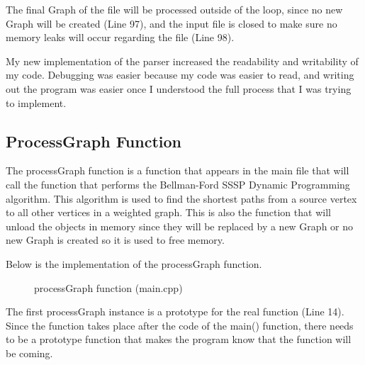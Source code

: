 \documentclass[letterpaper, 10pt]{article}
\begin{document}
\noindent
The final Graph of the file will be processed outside of the loop, since no new Graph will be created (Line 97), and the input file is closed to make sure no memory leaks will occur regarding the file (Line 98).

\vspace{1em}
\noindent
My new implementation of the parser increased the readability and writability of my code. Debugging was easier because my code was easier to read, and writing out the program was easier once I understood the full process that I was trying to implement.

\subsection{ProcessGraph Function}
\noindent
The processGraph function is a function that appears in the main file that will call the function that performs the Bellman-Ford SSSP Dynamic Programming algorithm. This algorithm is used to find the shortest paths from a source vertex to all other vertices in a weighted graph. This is also the function that will unload the objects in memory since they will be replaced by a new Graph or no new Graph is created so it is used to free memory. 

\vspace{1em}
\noindent
Below is the implementation of the processGraph function.

\vspace{-1.5em}
\begin{figure}[H]
  \centering
   
  \label{fig:figure2.3-part1}
\end{figure}

\vspace{-2em}

\begin{figure}[H]
  \centering
   
  \caption{processGraph function (main.cpp)}
  \label{fig:figure2.3-part2}
\end{figure}

\noindent
The first processGraph instance is a prototype for the real function (Line 14). Since the function takes place after the code of the main() function, there needs to be a prototype function that makes the program know that the function will be coming.

\vspace{1em}
\end{document}
